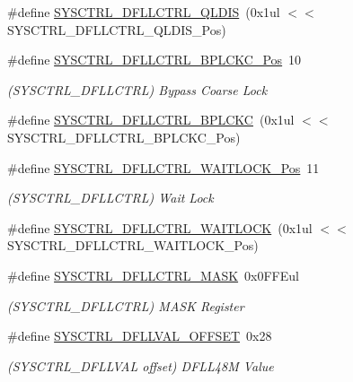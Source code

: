 \begin{DoxyCompactItemize}
\#define \mbox{\hyperlink{group___s_a_m_d21___s_y_s_c_t_r_l_gaea61f9c160f5e4e5f85bcf483dfc2dcf}{S\+Y\+S\+C\+T\+R\+L\+\_\+\+D\+F\+L\+L\+C\+T\+R\+L\+\_\+\+Q\+L\+D\+IS}}~(0x1ul $<$$<$ S\+Y\+S\+C\+T\+R\+L\+\_\+\+D\+F\+L\+L\+C\+T\+R\+L\+\_\+\+Q\+L\+D\+I\+S\+\_\+\+Pos)
\item 
\#define \mbox{\hyperlink{group___s_a_m_d21___s_y_s_c_t_r_l_ga055363c791383e403840e5ec0eb1315f}{S\+Y\+S\+C\+T\+R\+L\+\_\+\+D\+F\+L\+L\+C\+T\+R\+L\+\_\+\+B\+P\+L\+C\+K\+C\+\_\+\+Pos}}~10
\begin{DoxyCompactList}\small\item\em (S\+Y\+S\+C\+T\+R\+L\+\_\+\+D\+F\+L\+L\+C\+T\+RL) Bypass Coarse Lock \end{DoxyCompactList}\item 
\#define \mbox{\hyperlink{group___s_a_m_d21___s_y_s_c_t_r_l_gabbfa95696fd8ac05086fdaab93560d2f}{S\+Y\+S\+C\+T\+R\+L\+\_\+\+D\+F\+L\+L\+C\+T\+R\+L\+\_\+\+B\+P\+L\+C\+KC}}~(0x1ul $<$$<$ S\+Y\+S\+C\+T\+R\+L\+\_\+\+D\+F\+L\+L\+C\+T\+R\+L\+\_\+\+B\+P\+L\+C\+K\+C\+\_\+\+Pos)
\item 
\#define \mbox{\hyperlink{group___s_a_m_d21___s_y_s_c_t_r_l_ga6813c498b053a5ea8e146aee45a2ca4f}{S\+Y\+S\+C\+T\+R\+L\+\_\+\+D\+F\+L\+L\+C\+T\+R\+L\+\_\+\+W\+A\+I\+T\+L\+O\+C\+K\+\_\+\+Pos}}~11
\begin{DoxyCompactList}\small\item\em (S\+Y\+S\+C\+T\+R\+L\+\_\+\+D\+F\+L\+L\+C\+T\+RL) Wait Lock \end{DoxyCompactList}\item 
\#define \mbox{\hyperlink{group___s_a_m_d21___s_y_s_c_t_r_l_ga72493fa95c69451f384b4c5d227443ab}{S\+Y\+S\+C\+T\+R\+L\+\_\+\+D\+F\+L\+L\+C\+T\+R\+L\+\_\+\+W\+A\+I\+T\+L\+O\+CK}}~(0x1ul $<$$<$ S\+Y\+S\+C\+T\+R\+L\+\_\+\+D\+F\+L\+L\+C\+T\+R\+L\+\_\+\+W\+A\+I\+T\+L\+O\+C\+K\+\_\+\+Pos)
\item 
\#define \mbox{\hyperlink{group___s_a_m_d21___s_y_s_c_t_r_l_gabc179edc1ee8af64f79246d2e98b6391}{S\+Y\+S\+C\+T\+R\+L\+\_\+\+D\+F\+L\+L\+C\+T\+R\+L\+\_\+\+M\+A\+SK}}~0x0\+F\+F\+Eul
\begin{DoxyCompactList}\small\item\em (S\+Y\+S\+C\+T\+R\+L\+\_\+\+D\+F\+L\+L\+C\+T\+RL) M\+A\+SK Register \end{DoxyCompactList}\item 
\#define \mbox{\hyperlink{group___s_a_m_d21___s_y_s_c_t_r_l_ga2daeb478c4eaba216874399a40b5c4cc}{S\+Y\+S\+C\+T\+R\+L\+\_\+\+D\+F\+L\+L\+V\+A\+L\+\_\+\+O\+F\+F\+S\+ET}}~0x28
\begin{DoxyCompactList}\small\item\em (S\+Y\+S\+C\+T\+R\+L\+\_\+\+D\+F\+L\+L\+V\+AL offset) D\+F\+L\+L48M Value \end{DoxyCompactList}\item 
$$
\end{DoxyCompactItemize}

